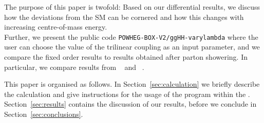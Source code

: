 The purpose of this paper is twofold: Based on our differential results, we discuss how the deviations from the SM can be cornered and how this changes with increasing centre-of-mass energy. \\
Further, we present the public code {\tt POWHEG-BOX-V2/ggHH-varylambda} where the user can choose the value of the trilinear coupling as an input parameter, and we compare the fixed order results to results obtained after parton showering. In particular, we compare results from \pythia~\cite{Sjostrand:2014zea} and \herwig~\cite{Bellm:2017bvx}.

This paper is organised as follows. In Section~\ref{sec:calculation} we briefly describe the calculation and give instructions for the usage of the program within the \powhegbox. Section~\ref{sec:results} contains the discussion of our results, before we conclude in Section~\ref{sec:conclusions}.
